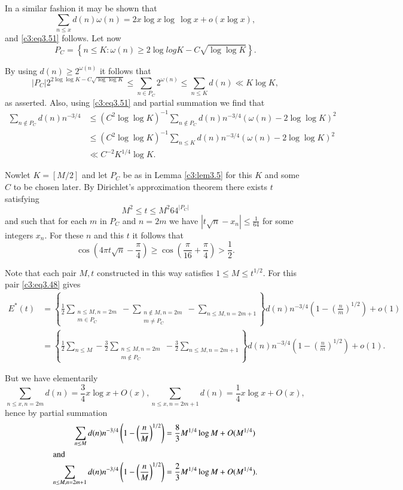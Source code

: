 In a similar fashion it may be shown that
$$
\sum_{n \leq x} d(n) \omega(n) = 2 x \log x \log \, \log x+ o(x \log x),
$$
and \eqref{c3:eq3.51} follows. Let now
$$
P_C = \left\{n \leq K: \omega(n) \geq 2 \log log K - C\sqrt{\log \log
  K} \right\}. 
$$

By using $d(n) \geq 2^{\omega(n)}$ it follows that
$$
|P_C| 2^{2 \log \log K- C\sqrt{\log \log K}} \leq \sum_{n \in P_C}
2^{\omega (n)} \leq \sum_{n \leq K} d(n) \ll K\log K,
$$
as asserted. Also, using \eqref{c3:eq3.51} and partial summation we
find that
\begin{align*}
  \sum_{n \notin P_C} d(n) n^{-3/4} & \leq (C^2 \log \log K)^{-1}
  \sum_{n \notin P_C} d(n) n^{- 3/4} (\omega(n) - 2 \log \log K)^2\\
  & \leq (C^2 \log \log K)^{-1} \sum_{n \leq K} d(n) n^{-3/4}
  (\omega(n)- 2 \log \log K)^2\\
  & \ll C^{-2} K^{1/4} \log K.
\end{align*}

Now\pageoriginale let $K = [M/2]$ and let $P_C$ be as in Lemma
\ref{c3:lem3.5} for this $K$ and some $C$ to be chosen later. By
Dirichlet's approximation theorem there exists $t$ satisfying
$$
M^2 \leq t \leq M^2 64^{|P_C|}
$$
and such that for each $m$ in $P_C$ and $n= 2 m$ we have $|t\sqrt{n} -
x_n| \leq \frac{1}{64}$ for some integers $x_n$. For these $n$ and
this $t$ it follows that 
$$
\cos \left(4 \pi t \sqrt{n}- \frac{\pi}{4}\right) \geq \cos
\left(\frac{\pi}{16} + \frac{\pi}{4} \right) > \frac{1}{2}.
$$

Note that each pair $M,t$ constructed in this way satisfies $1 \leq M
\leq t^{1/2}$. For this pair \eqref{c3:eq3.48} gives
{\fontsize{10}{12}\selectfont
\begin{align*}
  E^* (t) & = \left\{ \frac{1}{2} \sum_{\substack{n \leq M, n = 2m\\m
      \in P_C}} - \sum_{\substack{n \notin M, n= 2m\\m \neq P_C}} -
  \sum_{n \leq M, n= 2m+1}\right\} d(n) n^{-3/4} \left(1-
  \left(\frac{n}{m} \right)^{1/2} \right) + o(1)\\
  & = \left\{\frac{1}{2} \sum_{n \leq M} - \frac{3}{2} \sum_{\substack{n
  \leq M, n=2m\\ m \notin P_C}} - \frac{3}{2} \sum_{n \leq M, n=2m+1}
  \right\} d(n) n^{-3/4} \left(1- \left(\frac{n}{m} \right)^{1/2}
  \right)+ o(1).
\end{align*}}

But we have elementarily
$$ 
\sum_{n \leq x, n = 2m} d(n) = \frac{3}{4} x \log x + O (x), \sum_{n \leq
x, n=2m+1} d(n) = \frac{1}{4} x \log x + O (x),
$$
hence by partial summation
\begin{align*}
  \sum_{n \leq M} d(n) n^{-3/4} \left(1- \left(\frac{n}{M} \right)^{1/2}
  \right) & = \frac{8}{3} M^{1/4} \log M + O(M^{1/4})\\
  \intertext{and }
  \sum_{n \leq M, n=2 m+1} d(n) n^{-3/4} \left(1- \left(\frac{n}{M}
  \right)^{1/2} \right) &= \frac{2}{3} M^{1/4} \log M + O(M^{1/4}).
\end{align*}

